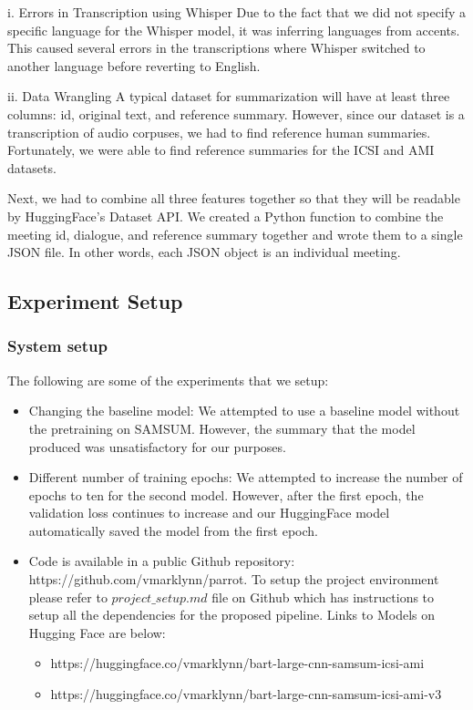 i.	Errors in Transcription using Whisper
Due to the fact that we did not specify a specific language for the Whisper model, it was inferring languages from accents. This caused several errors in the transcriptions where Whisper switched to another language before reverting to English.

ii.	Data Wrangling
A typical dataset for summarization will have at least three columns: id, original text, and reference summary. However, since our dataset is a transcription of audio corpuses, we had to find reference human summaries. Fortunately, we were able to find reference summaries for the ICSI and AMI datasets.

Next, we had to combine all three features together so that they will be readable by HuggingFace’s Dataset API. We created a Python function to combine the meeting id, dialogue, and reference summary together and wrote them to a single JSON file. In other words, each JSON object is an individual meeting.


\subsection{Experiment Setup}
\subsubsection{System setup}

The following are some of the experiments that we setup:

\begin{itemize}
\item Changing the baseline model:
We attempted to use a baseline model without the pretraining on SAMSUM. However, the summary that the model produced was unsatisfactory for our purposes.

\item Different number of training epochs: 
We attempted to increase the number of epochs to ten for the second model. However, after the first epoch, the validation loss continues to increase and our HuggingFace model automatically saved the model from the first epoch.

\item Code is available in a public Github repository: \\https://github.com/vmarklynn/parrot. To setup the project environment please refer to $project\_setup.md$ file on Github which has instructions to setup all the dependencies for the proposed pipeline. Links to Models on Hugging Face are below:

	\begin{itemize}
	\item https://huggingface.co/vmarklynn/bart-large-cnn-samsum-icsi-ami
	\item https://huggingface.co/vmarklynn/bart-large-cnn-samsum-icsi-ami-v3
	\end{itemize}

\end{itemize}


